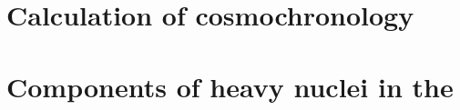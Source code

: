 \appendix

\chapter{Calculation of cosmochronology} \label{sec:calc-cosmo-chronology}


\chapter{Components of heavy nuclei in the \sos} \label{sec:sos-nuclei}



